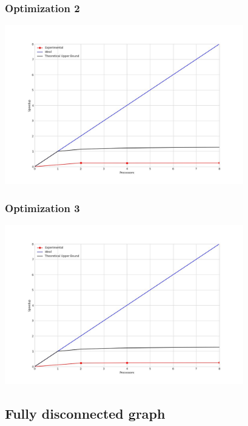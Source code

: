 \clearpage
\subsubsection{Optimization 2}
\begin{center}
    \resizebox{0.8\textwidth}{!}{}
    \includegraphics[width=0.78\textwidth]{../img/speedup-graph_type-fully-connected-12500-O2}
\end{center}

\subsubsection{Optimization 3}
\begin{center}
    \resizebox{0.8\textwidth}{!}{}
    \includegraphics[width=0.78\textwidth]{../img/speedup-graph_type-fully-connected-12500-O3}
\end{center}

\clearpage
\subsection{Fully disconnected graph}
